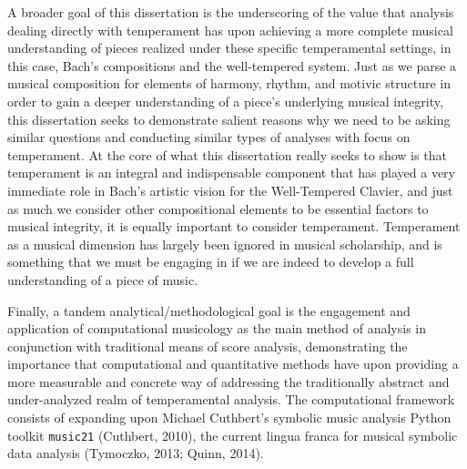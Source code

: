 A broader goal of this dissertation is the underscoring of the value
that analysis dealing directly with temperament has upon achieving a
more complete musical understanding of pieces realized under these
specific temperamental settings, in this case, Bach's compositions and
the well-tempered system. Just as we parse a musical composition for
elements of harmony, rhythm, and motivic structure in order to gain a
deeper understanding of a piece's underlying musical integrity, this
dissertation seeks to demonstrate salient reasons why we need to be
asking similar questions and conducting similar types of analyses with
focus on temperament. At the core of what this dissertation really seeks
to show is that temperament is an integral and indispensable component
that has played a very immediate role in Bach's artistic vision for the
Well-Tempered Clavier, and just as much we consider other compositional
elements to be essential factors to musical integrity, it is equally
important to consider temperament. Temperament as a musical dimension
has largely been ignored in musical scholarship, and is something that
we must be engaging in if we are indeed to develop a full understanding
of a piece of music.

Finally, a tandem analytical/methodological goal is the engagement and
application of computational musicology as the main method of analysis
in conjunction with traditional means of score analysis, demonstrating
the importance that computational and quantitative methods have upon
providing a more measurable and concrete way of addressing the
traditionally abstract and under-analyzed realm of temperamental
analysis. The computational framework consists of expanding upon Michael
Cuthbert's symbolic music analysis Python toolkit \texttt{music21}
(Cuthbert, 2010), the current lingua franca for musical symbolic data
analysis (Tymoczko, 2013; Quinn, 2014).

